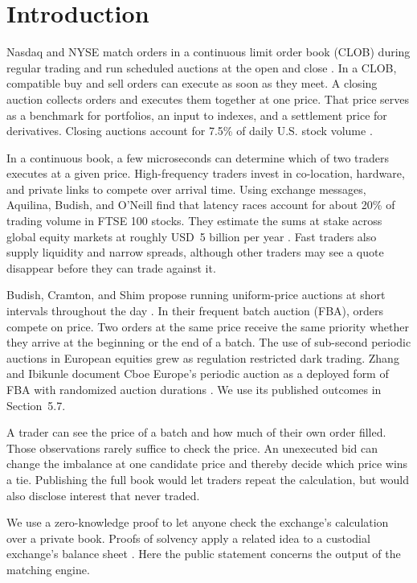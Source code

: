 
\section{Introduction}

Nasdaq and NYSE match orders in a continuous limit order book (CLOB) during
regular trading and run scheduled auctions at the open and close
\cite{harris2003}. In a CLOB, compatible buy and sell orders can execute as
soon as they meet. A closing auction collects orders and executes them
together at one price. That price serves as a benchmark for portfolios, an
input to indexes, and a settlement price for derivatives. Closing auctions
account for 7.5\% of daily U.S. stock volume \cite{bogousslavsky2023}.

In a continuous book, a few microseconds can determine which of two traders
executes at a given price. High-frequency traders invest in co-location,
hardware, and private links to compete over arrival time. Using exchange
messages, Aquilina, Budish, and O'Neill find that latency races account for
about 20\% of trading volume in FTSE 100 stocks. They estimate the sums at
stake across global equity markets at roughly USD~5 billion per year
\cite{aquilina2022}. Fast traders also supply liquidity and narrow spreads,
although other traders may see a quote disappear before they can trade
against it.

Budish, Cramton, and Shim propose running uniform-price auctions at short
intervals throughout the day \cite{budish2014,budish2015}. In their frequent
batch auction (FBA), orders compete on price. Two orders at the same price
receive the same priority whether they arrive at the beginning or the end of
a batch. The use of sub-second periodic auctions in European equities grew as
regulation restricted dark trading. Zhang and Ibikunle document Cboe
Europe's periodic auction as a deployed form of FBA with randomized auction
durations \cite[Section~3.2]{zhang2023}. We use its published outcomes in
Section~5.7.

A trader can see the price of a batch and how much of their own order filled.
Those observations rarely suffice to check the price. An unexecuted bid can
change the imbalance at one candidate price and thereby decide which price
wins a tie. Publishing the full book would let traders repeat the
calculation, but would also disclose interest that never traded.

We use a zero-knowledge proof \cite{gmw1986} to let anyone check the
exchange's calculation over a private book. Proofs of solvency apply a
related idea to a custodial exchange's balance sheet \cite{provisions2015}.
Here the public statement concerns the output of the matching engine.

